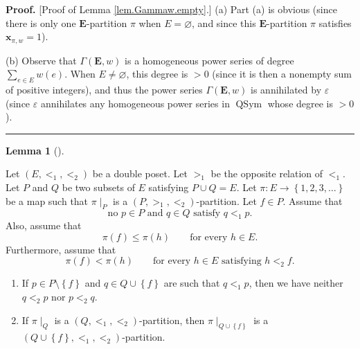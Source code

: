 \documentclass[numbers=enddot,12pt,final,onecolumn,notitlepage,abstracton]{scrartcl}%
\theoremstyle{definition}
\newtheorem{lem}[theo]{Lemma}
\newenvironment{lemma}[1][]
{\begin{lem}[#1]\begin{leftbar}}
{\end{leftbar}\end{lem}}
\newenvironment{proof}[1][Proof]{\noindent\textbf{#1.} }{\ \rule{0.5em}{0.5em}}
\let\sumnonlimits\sum
\renewcommand{\sum}{\sumnonlimits\limits}
\newcommand{\xx}{{\mathbf{x}}}
\newcommand{\QSym}{{\operatorname{QSym}}}
\newcommand{\EE}{{\mathbf{E}}}
\begin{document}
\begin{proof}
[Proof of Lemma \ref{lem.Gammaw.empty}.] (a) Part (a) is obvious (since there is
only one $\EE$-partition $\pi$ when $E=\varnothing$, and since
this $\EE$-partition $\pi$ satisfies $\xx_{\pi, w} = 1$).

(b) Observe that $\Gamma \left( \EE, w \right)$ is a homogeneous power
series of degree $\sum_{e\in E} w\left( e \right)$. When $E \neq \varnothing$,
this degree is $>0$ (since it is then a nonempty sum of positive integers),
and thus the power series $\Gamma \left( \EE, w \right)$
is annihilated by $\varepsilon$ (since $\varepsilon$ annihilates any
homogeneous power series in $\QSym$ whose degree is $> 0$).
\end{proof}

\begin{lemma}
\label{lem.Gammaw.toggle}
Let $\left(E, <_1, <_2\right)$ be a double poset. Let $>_1$ be the opposite
relation of $<_1$. Let $P$ and $Q$ be two
subsets of $E$ satisfying $P \cup Q = E$.
Let $\pi : E \to \left\{1, 2, 3, \ldots\right\}$ be a map such
that $\pi \mid_P$ is a $\left(P, >_1, <_2\right)$-partition.
Let $f \in P$. Assume that
\begin{equation}
\text{no } p \in P \text{ and } q \in Q \text{ satisfy }
q <_1 p.
\label{eq.lem.Gammaw.toggle.eq0}
\end{equation}
Also, assume that
\begin{equation}
\pi\left( f \right) \leq \pi\left( h \right)
\qquad \text{for every } h \in E .
\label{eq.lem.Gammaw.toggle.eq1}
\end{equation}
Furthermore, assume that
\begin{equation}
\pi \left( f \right) < \pi \left( h \right)
\qquad \text{for every } h \in E \text{ satisfying } h <_2 f .
\label{eq.lem.Gammaw.toggle.eq2}
\end{equation}

\begin{enumerate}
\item[(a)] If $p \in P \setminus \left\{f\right\}$
and $q \in Q \cup \left\{f\right\}$ are such that
$q <_1 p$, then we have neither $q <_2 p$ nor
$p <_2 q$.

\item[(b)] If $\pi \mid_Q$ is a $\left(Q, <_1, <_2\right)$-partition,
then
$\pi \mid_{Q \cup \left\{f\right\}}$ is a
$\left(Q \cup \left\{f\right\}, <_1, <_2\right)$-partition.
\end{enumerate}
\end{lemma}
\end{document}
